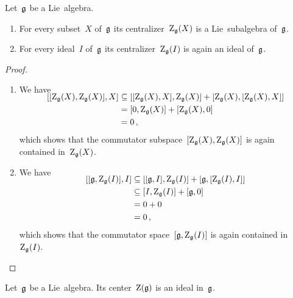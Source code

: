 \begin{proposition}
	\label{structure of centralizers}
	Let~$\mathfrak{g}$ be a Lie~algebra.
	\begin{enumerate}
		\item
			For every subset~$X$ of~$\mathfrak{g}$ its centralizer~$\operatorname{Z}_{\mathfrak{g}}(X)$ is a Lie~subalgebra of~$\mathfrak{g}$.
		\item
			\label{centralizer of an ideal is again an ideal}
			For every ideal~$I$ of~$\mathfrak{g}$ its centralizer~$\operatorname{Z}_{\mathfrak{g}}(I)$ is again an ideal of~$\mathfrak{g}$.
	\end{enumerate}
\end{proposition}


\begin{proof}
	\leavevmode
	\begin{enumerate}
		\item
			We have
			\begin{align*}
				\SwapAboveDisplaySkip
				[ [ \centerlie_{\glie}(X), \centerlie_{\glie}(X) ], X ]
				&\subseteq
				[ [ \centerlie_{\glie}(X), X ], \centerlie_{\glie}(X) ]
				+ [ \centerlie_{\glie}(X), [ \centerlie_{\glie}(X), X ] ]
				\\
				&=
				[ 0, \centerlie_{\glie}(X) ]
				+ [ \centerlie_{\glie}(X), 0 ]
				\\
				&=
				0 \,,
			\end{align*}
			which shows that the commutator subspace~$[ \operatorname{Z}_{\mathfrak{g}}(X), \operatorname{Z}_{\mathfrak{g}}(X) ]$ is again contained in~$\operatorname{Z}_{\mathfrak{g}}(X)$.
		\item
			We have
			\begin{align*}
				\SwapAboveDisplaySkip
				[ [\glie, \centerlie_{\glie}(I)], I ]
				&\subseteq
				[ [\glie, I], \centerlie_{\glie}(I) ]
				+ [ \glie, [ \centerlie_{\glie}(I), I] ]
				\\
				&\subseteq
				[ I, \centerlie_{\glie}(I) ]
				+ [ \glie, 0 ]
				\\
				&=
				0 + 0
				\\
				&=
				0 \,,
			\end{align*}
			which shows that the commutator space~$[\mathfrak{g}, \operatorname{Z}_{\mathfrak{g}}(I)]$ is again contained in~$\operatorname{Z}_{\mathfrak{g}}(I)$.
		\qedhere
	\end{enumerate}
\end{proof}


\begin{corollary}
	Let~$\mathfrak{g}$ be a Lie~algebra.
	Its center~$\operatorname{Z}(\mathfrak{g})$ is an ideal in~$\mathfrak{g}$.
\end{corollary}



